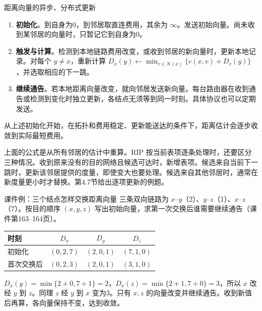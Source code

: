 \begin{proposition}{距离向量的异步、分布式更新}
\begin{enumerate}[nosep]
  \item \textbf{初始化}。到自身为0，到邻居取直连费用，其余为 $\infty$。发送初始向量。尚未收到某邻居的向量时，只暂记它到自身为0。
  \item \textbf{触发与计算}。检测到本地链路费用改变，或收到邻居的新向量时，更新本地记录。对每个 $y\ne x$，重新计算 $D_x(y)\gets\min_{v\in\mathcal{N}(x)}\{c(x,v)+D_v(y)\}$，并选取相应的下一跳。
  \item \textbf{继续通告}。若本地距离向量改变，就向邻居发送新向量。每台路由器在收到通告或检测到变化时独立更新，各结点无须等到同一时刻。具体协议也可以定期发送。
\end{enumerate}
从上述初始化开始，在拓扑和费用稳定、更新能送达的条件下，距离估计会逐步收敛到实际最短费用。
\end{proposition}
\begin{remark}
  上面的公式是从所有邻居的估计中重算。RIP 按当前表项逐条处理时，还要区分三种情况。收到原来没有的目的网络且候选可达时，新增表项。候选来自当前下一跳时，更新该邻居提供的度量，即使变大也要处理。候选来自其他邻居时，通常在新度量更小时才替换。第4.7节给出逐项更新的例题。
\end{remark}

\begin{example}{课件例：三个结点怎样交换距离向量}
三条双向链路为 $x$--$y$（2）、$y$--$z$（1）、$x$--$z$（7）。按目的顺序 $(x,y,z)$ 写出初始向量，求第一次交换后谁需要继续通告（课件第163--164页）。
\end{example}
\begin{solution}
\begin{center}\small
\begin{tabular}{lccc}
  \toprule
  时刻 & $D_x$ & $D_y$ & $D_z$\\\midrule
  初始化 & $(0,2,7)$ & $(2,0,1)$ & $(7,1,0)$\\
  首次交换后 & $(0,2,3)$ & $(2,0,1)$ & $(3,1,0)$\\\bottomrule
\end{tabular}
\end{center}
$D_x(y)=\min\{2+0,7+1\}=2$，$D_x(z)=\min\{2+1,7+0\}=3$，所以 $x$ 改经 $y$ 到 $z$。同理 $z$ 经 $y$ 到 $x$ 变为3。只有 $x,z$ 的向量改变并继续通告。收到新值后再算，各向量保持不变，达到收敛。
\end{solution}

